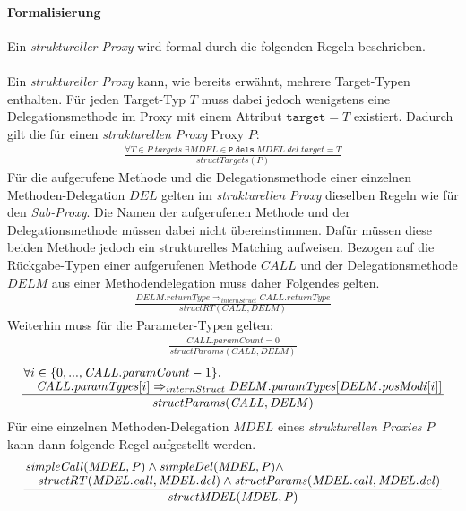 \documentclass[a4paper,12pt]{article}
\begin{document}
\paragraph{Formalisierung}
Ein \emph{struktureller Proxy} wird formal durch die folgenden Regeln beschrieben.\\\\
Ein \emph{struktureller Proxy} kann, wie bereits erwähnt, mehrere Target-Typen enthalten.
Für jeden Target-Typ $T$ muss dabei jedoch wenigstens eine Delegationsmethode im Proxy mit einem Attribut $\texttt{target} = T$ existiert. Dadurch gilt die für einen \emph{strukturellen Proxy} Proxy $P$:
\begin{gather*}
\frac{\forall T \in \mathit{P.targets}.\exists \mathit{MDEL} \in \mathtt{P.dels}.\mathit{MDEL.del.target} = T}{\mathit{structTargets(P)}}
\end{gather*}
Für die aufgerufene Methode und die Delegationsmethode einer einzelnen Methoden-Delegation $\mathit{DEL}$ gelten im \emph{strukturellen Proxy} dieselben Regeln wie für den \emph{Sub-Proxy}. Die Namen der aufgerufenen Methode und der Delegationsmethode müssen dabei nicht übereinstimmen. Dafür müssen diese beiden Methode jedoch ein strukturelles Matching aufweisen. Bezogen auf die Rückgabe-Typen einer aufgerufenen Methode $\mathit{CALL}$ und der Delegationsmethode $\mathit{DELM}$ aus einer Methodendelegation muss daher Folgendes gelten.
\begin{gather*}
\frac{\mathit{DELM.returnType} \Rightarrow_{internStruct} \mathit{CALL.returnType}}{\mathit{structRT(CALL, DELM)}}
\end{gather*} 
Weiterhin muss für die Parameter-Typen gelten:
\begin{gather*}
\frac{\mathit{CALL.paramCount} = 0}{\mathit{structParams(CALL, DELM)}}
\end{gather*} 
\begin{gather*}
\frac{\splitfrac{\forall i \in \{0,...,\mathit{CALL.paramCount}-1\}.}
{ \mathit{CALL.paramTypes}[i] \Rightarrow_{internStruct} \mathit{DELM.paramTypes}[\mathit{DELM.posModi}[i]]
}}{\mathit{structParams(CALL, DELM)}}
\end{gather*} 
Für eine einzelnen Methoden-Delegation $\mathit{MDEL}$ eines \emph{strukturellen Proxies} $P$ kann dann folgende Regel aufgestellt werden.
\begin{gather*}
\frac{\splitfrac{\mathit{simpleCall(MDEL,P)} \wedge \mathit{simpleDel(MDEL,P)} \wedge} {\mathit{structRT(MDEL.call, MDEL.del)} \wedge \mathit{structParams(MDEL.call, MDEL.del)}}
}
{\mathit{structMDEL(MDEL, P)}}
\end{gather*}
\end{document}
